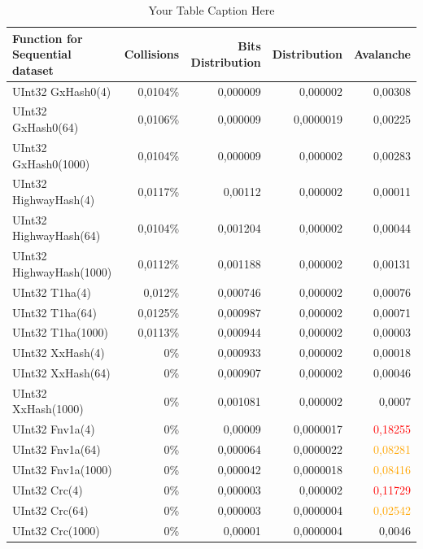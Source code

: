 \documentclass[10pt]{article}
\begin{document}
\begin{table}[H]
\centering
\begin{tabular}{|l|r|r|r|r|}
\hline
\textbf{Function for Sequential dataset} & \textbf{Collisions} & \textbf{Bits Distribution} & \textbf{Distribution} & \textbf{Avalanche} \\
\hline
UInt32 GxHash0(4)                & 0,0104\% & 0,000009  & 0,000002 & 0,00308 \\
UInt32 GxHash0(64)               & 0,0106\% & 0,000009  & 0,0000019 & 0,00225 \\
UInt32 GxHash0(1000)             & 0,0104\% & 0,000009  & 0,000002 & 0,00283 \\
UInt32 HighwayHash(4)            & 0,0117\% & 0,00112   & 0,000002 & 0,00011 \\
UInt32 HighwayHash(64)           & 0,0104\% & 0,001204  & 0,000002 & 0,00044 \\
UInt32 HighwayHash(1000)         & 0,0112\% & 0,001188  & 0,000002 & 0,00131 \\
UInt32 T1ha(4)                   & 0,012\%  & 0,000746  & 0,000002 & 0,00076 \\
UInt32 T1ha(64)                  & 0,0125\% & 0,000987  & 0,000002 & 0,00071 \\
UInt32 T1ha(1000)                & 0,0113\% & 0,000944  & 0,000002 & 0,00003 \\
UInt32 XxHash(4)                & 0\%      & 0,000933  & 0,000002 & 0,00018 \\
UInt32 XxHash(64)               & 0\%      & 0,000907  & 0,000002 & 0,00046 \\
UInt32 XxHash(1000)             & 0\%      & 0,001081  & 0,000002 & 0,0007 \\
UInt32 Fnv1a(4)                 & 0\%      & 0,00009   & 0,0000017 & \textcolor{red}{0,18255} \\
UInt32 Fnv1a(64)                & 0\%      & 0,000064  & 0,0000022 & \textcolor{orange}{0,08281} \\
UInt32 Fnv1a(1000)              & 0\%      & 0,000042  & 0,0000018 & \textcolor{orange}{0,08416} \\
UInt32 Crc(4)                   & 0\%      & 0,000003  & 0,000002 & \textcolor{red}{0,11729} \\
UInt32 Crc(64)                  & 0\%      & 0,000003  & 0,0000004 & \textcolor{orange}{0,02542} \\
UInt32 Crc(1000)                & 0\%      & 0,00001   & 0,0000004 & 0,0046 \\
\hline
\end{tabular}
\caption{Your Table Caption Here}
\label{tab:my_label}
\end{table}
\end{document}
